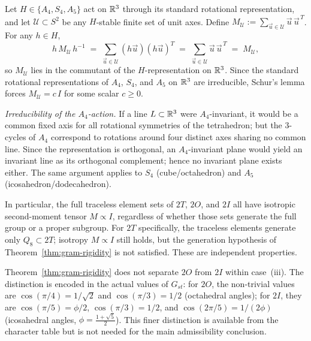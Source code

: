   \begin{remark}
    \label{rem:isotropy}
    Let $H \in \{A_4, S_4, A_5\}$ act on $\mathbb{R}^3$ through its standard rotational
    representation, and let $\mathcal{U} \subset S^2$ be any $H$-stable finite set of
    unit axes.
    Define $M_{\mathcal{U}} := \sum_{\vec{u} \in \mathcal{U}} \vec{u}\,\vec{u}^{\,T}$.
    For any $h \in H$,
    \[
      h\,M_{\mathcal{U}}\,h^{-1}
      \;=\; \sum_{\vec{u} \in \mathcal{U}} (h\vec{u})(h\vec{u})^T
      \;=\; \sum_{\vec{u} \in \mathcal{U}} \vec{u}\,\vec{u}^{\,T}
      \;=\; M_{\mathcal{U}},
    \]
    so $M_{\mathcal{U}}$ lies in the commutant of the $H$-representation on $\mathbb{R}^3$.
    Since the standard rotational representations of $A_4$, $S_4$, and $A_5$ on $\mathbb{R}^3$
    are irreducible, Schur's lemma forces $M_{\mathcal{U}} = c\,I$ for some scalar $c \ge 0$.

    \emph{Irreducibility of the $A_4$-action.}
    If a line $L \subset \mathbb{R}^3$ were $A_4$-invariant, it would be a common fixed axis for all
    rotational symmetries of the tetrahedron; but the $3$-cycles of $A_4$ correspond to
    rotations around four distinct axes sharing no common line.
    Since the representation is orthogonal, an $A_4$-invariant plane would yield an
    invariant line as its orthogonal complement; hence no invariant plane exists either.
    The same argument applies to $S_4$ (cube/octahedron) and $A_5$ (icosahedron/dodecahedron).

    In particular, the full traceless element sets of $2T$, $2O$, and $2I$ all have
    isotropic second-moment tensor $M \propto I$, regardless of whether those sets
    generate the full group or a proper subgroup.
    For $2T$ specifically, the traceless elements generate only $Q_8 \subset 2T$;
    isotropy $M \propto I$ still holds, but the generation hypothesis of
    Theorem~\ref{thm:gram-rigidity} is not satisfied.
    These are independent properties.
  \end{remark}

  \begin{remark}
    \label{rem:2O-vs-2I}
    Theorem~\ref{thm:gram-rigidity} does not separate $2O$ from $2I$ within case~(iii).
    The distinction is encoded in the actual values of $G_{st}$: for $2O$, the
    non-trivial values are $\cos(\pi/4) = 1/\sqrt{2}$ and $\cos(\pi/3) = 1/2$
    (octahedral angles); for $2I$, they are $\cos(\pi/5) = \phi/2$,
    $\cos(\pi/3) = 1/2$, and $\cos(2\pi/5) = 1/(2\phi)$ (icosahedral angles,
    $\phi = \frac{1+\sqrt{5}}{2}$).
    This finer distinction is available from the character table but is not needed
    for the main admissibility conclusion.
  \end{remark}
